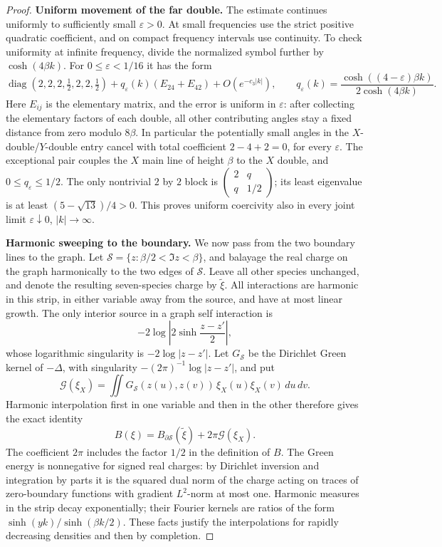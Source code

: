 \begin{proof}
\par\smallskip\noindent\textbf{Uniform movement of the far double.}
The estimate continues uniformly to sufficiently small
\(\varepsilon>0\).  At small frequencies use the strict positive
quadratic coefficient, and on compact frequency intervals use
continuity.  To check uniformity at infinite frequency, divide
the normalized symbol further by \(\cosh(4\beta k)\).
For \(0\le\varepsilon<1/16\) it has the form
\[
 \operatorname{diag}(2,2,2,\tfrac12,2,2,\tfrac12)
 +q_\varepsilon(k)(E_{24}+E_{42})
 +O(e^{-c_3|k|}),\qquad
 q_\varepsilon(k)=
 \frac{\cosh((4-\varepsilon)\beta k)}{2\cosh(4\beta k)}.
\]
Here \(E_{ij}\) is the elementary matrix, and the error is uniform
in \(\varepsilon\): after collecting the elementary factors of
each double, all other contributing angles stay a fixed distance
from zero modulo \(8\beta\).  In particular the potentially small
angles in the \(X\)-double/\(Y\)-double entry cancel with total
coefficient \(2-4+2=0\), for every \(\varepsilon\).
The exceptional pair couples the \(X\) main line of height
\(\beta\) to the \(X\) double, and \(0\le q_\varepsilon\le1/2\).
The only nontrivial \(2\) by \(2\) block is
\(\left(\begin{smallmatrix}2&q\\q&1/2\end{smallmatrix}\right)\);
its least eigenvalue is at least
\((5-\sqrt{13})/4>0\).
This proves uniform coercivity also in every joint limit
\(\varepsilon\downarrow0\), \(|k|\to\infty\).

\par\smallskip\noindent\textbf{Harmonic sweeping to the boundary.}
We now pass from the two boundary lines to the graph.
Let \(\mathcal S=\{z:\beta/2<\Im z<\beta\}\), and balayage the
real charge on the graph harmonically to the two edges of
\(\mathcal S\).  Leave all other species unchanged, and denote the
resulting seven-species charge by \(\widetilde\xi\).
All interactions are harmonic in this strip, in either variable
away from the source, and have at most linear growth.
The only interior source in a graph self interaction is
\[
 -2\log\left|2\sinh\frac{z-z'}2\right|,
\]
whose logarithmic singularity is \(-2\log|z-z'|\).
Let \(G_{\mathcal S}\) be the Dirichlet Green kernel of
\(-\Delta\), with singularity
\(-(2\pi)^{-1}\log|z-z'|\), and put
\[
 \mathcal G(\xi_X)=
 \iint G_{\mathcal S}(z(u),z(v))\,\xi_X(u)\xi_X(v)\,du\,dv.
\]
Harmonic interpolation first in one variable and then in the other
therefore gives the exact identity
\begin{equation}
 B(\xi)=B_{\partial\mathcal S}(\widetilde\xi)
              +2\pi\mathcal G(\xi_X).
 \label{eq:06-balayage}
\end{equation}
The coefficient \(2\pi\) includes the factor \(1/2\) in the
definition of \(B\).
The Green energy is nonnegative for signed real charges: by
Dirichlet inversion and integration by parts it is the squared
dual norm of the charge acting on traces of zero-boundary
functions with gradient \(L^2\)-norm at most one.
Harmonic measures in the strip decay exponentially; their Fourier
kernels are ratios of the form
\(\sinh(yk)/\sinh(\beta k/2)\).
These facts justify the interpolations for rapidly decreasing
densities and then by completion.


\end{proof}
